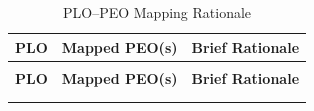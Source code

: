 \setcounter{table}{0}
\renewcommand{\thetable}{B.\arabic{table}}
{\footnotesize
\begin{longtable}{>{\raggedright\arraybackslash}p{}
                  >{\centering\arraybackslash}p{}
                  >{\raggedright\arraybackslash}p{}}
\caption{PLO--PEO Mapping Rationale}
\label{table:plo-peo_mapping_rationale}\\
\toprule
\textbf{PLO} & \textbf{Mapped PEO(s)} & \textbf{Brief Rationale} \\
\midrule
\endfirsthead
\multicolumn{3}{l}{\textit{\tablename~\thetable{} (continued)}}\\
\toprule
\textbf{PLO} & \textbf{Mapped PEO(s)} & \textbf{Brief Rationale} \\
\midrule
\endhead
\midrule
\multicolumn{3}{r}{\textit{Continued on next page}}\\
\endfoot
\bottomrule
\endlastfoot


\end{longtable}}
